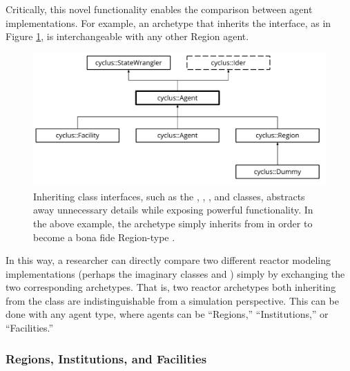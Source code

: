 Critically, this novel functionality enables the comparison
between agent implementations. For example, 
an archetype that inherits the  interface, as in Figure
\ref{fig:agent_uml}, is interchangeable with any other Region agent.


\begin{figure}[htbp]
\begin{center}
\includegraphics[width=\columnwidth]{./images/agent_uml}
\end{center}
\caption{Inheriting \Cyclus class interfaces, such as the ,
, , and  classes, abstracts away
unnecessary details while exposing powerful functionality. In the above
example, the  archetype simply inherits from  in
order to become a bona fide Region-type .}
\label{fig:agent_uml}
\end{figure}

In this way, a researcher can directly compare two different reactor modeling
implementations (perhaps the imaginary classes  and )
simply by exchanging the two corresponding archetypes. That is, two reactor
archetypes both inheriting from the  class are indistinguishable
from a simulation perspective.  This can be done with any agent type, where agents can be ``Regions,'' ``Institutions,'' or ``Facilities.''

\subsubsection{Regions, Institutions, and Facilities}
\label{sec:rif}

